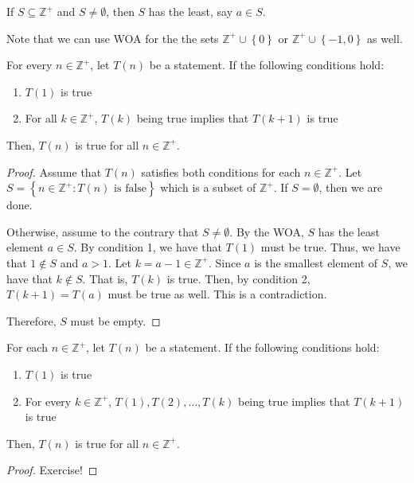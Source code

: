 \begin{theorem}
    If \(S \subseteq \mathbb{Z}^+\) and \(S \neq \emptyset\), then \(S\) has the least, say \(a \in S\).
\end{theorem}

\begin{distraction}
    Note that we can use WOA for the the sets \(\mathbb{Z}^+ \cup \left\{0\right\}\) or \(\mathbb{Z}^+ \cup \left\{-1, 0\right\}\) as well.
\end{distraction}

\begin{theorem}
    For every \(n \in \mathbb{Z}^+\), let \(T(n)\) be a statement. If the following conditions hold:
    \begin{enumerate}
        \item \(T(1)\) is true
        \item For all \(k \in \mathbb{Z}^+\), \(T(k)\) being true implies that \(T(k+1)\) is true
    \end{enumerate}
    Then, \(T(n)\) is true for all \(n \in \mathbb{Z}^+\).
\end{theorem}

\begin{proof}
    Assume that \(T(n)\) satisfies both conditions for each \(n \in \mathbb{Z}^+\). Let \(S = \left\{n \in \mathbb{Z}^+ : T(n) \text{ is false}\right\}\) which is a subset of \(\mathbb{Z}^+\). If \(S = \emptyset\), then we are done.

    Otherwise, assume to the contrary that \(S \neq \emptyset\). By the WOA, \(S\) has the least element \(a \in S\). By condition 1, we have that \(T(1)\) must be true. Thus, we have that \(1 \notin S\) and \(a > 1\). Let \(k = a - 1 \in \mathbb{Z}^+\). Since \(a\) is the smallest element of \(S\), we have that \(k \notin S\). That is, \(T(k)\) is true. Then, by condition 2, \(T(k+1) = T(a)\) must be true as well. This is a contradiction.

    Therefore, \(S\) must be empty.
\end{proof}

\begin{theorem}
    For each \(n \in \mathbb{Z}^+\), let \(T(n)\) be a statement. If the following conditions hold:
    \begin{enumerate}
        \item \(T(1)\) is true
        \item For every \(k \in \mathbb{Z}^+\), \(T(1), T(2), \ldots, T(k)\) being true implies that \(T(k+1)\) is true
    \end{enumerate}
    Then, \(T(n)\) is true for all \(n \in \mathbb{Z}^+\).
\end{theorem}

\begin{proof}
    Exercise!
\end{proof}

